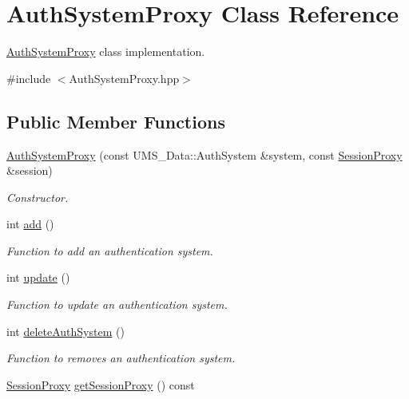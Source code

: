 \hypertarget{classAuthSystemProxy}{
\section{AuthSystemProxy Class Reference}
\label{classAuthSystemProxy}
}


\hyperlink{classAuthSystemProxy}{AuthSystemProxy} class implementation.  




{\ttfamily \#include $<$AuthSystemProxy.hpp$>$}

\subsection*{Public Member Functions}
\begin{DoxyCompactItemize}
\item 
\hyperlink{classAuthSystemProxy_a53ae5a00976829bf23f99d7a0865f312}{AuthSystemProxy} (const UMS\_\-Data::AuthSystem \&system, const \hyperlink{classSessionProxy}{SessionProxy} \&session)
\begin{DoxyCompactList}\small\item\em Constructor. \item\end{DoxyCompactList}\item 
int \hyperlink{classAuthSystemProxy_a692c1c6a214b4d00bf3b5aeb7399828a}{add} ()
\begin{DoxyCompactList}\small\item\em Function to add an authentication system. \item\end{DoxyCompactList}\item 
int \hyperlink{classAuthSystemProxy_afd2b3dd5299644166ea9f6c7ab927efe}{update} ()
\begin{DoxyCompactList}\small\item\em Function to update an authentication system. \item\end{DoxyCompactList}\item 
int \hyperlink{classAuthSystemProxy_ad3d0a95c1f9cbac5be6f265297581e8b}{deleteAuthSystem} ()
\begin{DoxyCompactList}\small\item\em Function to removes an authentication system. \item\end{DoxyCompactList}\item 
\hyperlink{classSessionProxy}{SessionProxy} \hyperlink{classAuthSystemProxy_aec0a88096f0596fdb0438965779e0c5c}{getSessionProxy} () const 

\end{DoxyCompactItemize}
